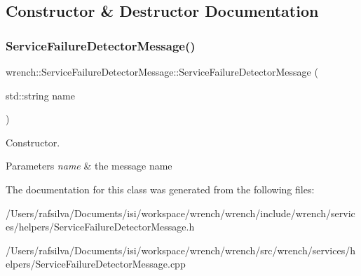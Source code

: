 \subsection{Constructor \& Destructor Documentation}
\mbox{\label{classwrench_1_1_service_failure_detector_message_a96258a4a4050be33122920b1afabc3d2}} 
\subsubsection{\texorpdfstring{Service\+Failure\+Detector\+Message()}{ServiceFailureDetectorMessage()}}
{\footnotesize\ttfamily wrench\+::\+Service\+Failure\+Detector\+Message\+::\+Service\+Failure\+Detector\+Message (\begin{DoxyParamCaption}\item[{std\+::string}]{name }\end{DoxyParamCaption})\hspace{0.3cm}{\ttfamily [protected]}}



Constructor. 


\begin{DoxyParams}{Parameters}
{\em name} & the message name \\
\hline
\end{DoxyParams}


The documentation for this class was generated from the following files\+:\begin{DoxyCompactItemize}
\item 
/\+Users/rafsilva/\+Documents/isi/workspace/wrench/wrench/include/wrench/services/helpers/Service\+Failure\+Detector\+Message.\+h\item 
/\+Users/rafsilva/\+Documents/isi/workspace/wrench/wrench/src/wrench/services/helpers/Service\+Failure\+Detector\+Message.\+cpp\end{DoxyCompactItemize}
